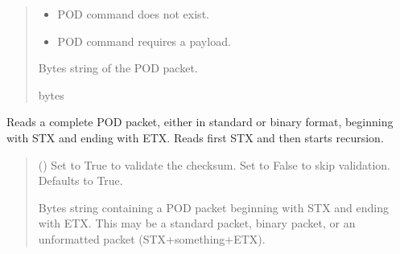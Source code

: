 \documentclass[letterpaper,10pt,english]{sphinxmanual}
\begin{document}
\begin{fulllineitems}
\begin{fulllineitems}
\begin{quote}
\begin{description}
\begin{itemize}
\end{itemize}

\begin{itemize}
\item {} 
\sphinxAtStartPar
{} \textendash{} POD command does not exist.

\item {} 
\sphinxAtStartPar
{} \textendash{} POD command requires a payload.

\end{itemize}

\sphinxAtStartPar
Bytes string of the POD packet.

\sphinxAtStartPar
bytes

\end{description}\end{quote}

\end{fulllineitems}


\begin{fulllineitems}
\label{\detokenize{BasicPodProtocol:BasicPodProtocol.POD_Basics.ReadPODpacket}}
\pysigstartsignatures
{}
\pysigstopsignatures
\sphinxAtStartPar
Reads a complete POD packet, either in standard or binary format, beginning with STX and         ending with ETX. Reads first STX and then starts recursion.
\begin{quote}\begin{description}
\sphinxAtStartPar
{} (\sphinxstyleliteralemphasis{\sphinxupquote{, }}) \textendash{} Set to True to validate the checksum. Set to False to                 skip validation. Defaults to True.

\sphinxAtStartPar
Bytes string containing a POD packet beginning with STX and ending with ETX. This                 may be a standard packet, binary packet, or an unformatted packet (STX+something+ETX).


\end{description}
\end{quote}
\end{fulllineitems}
\end{fulllineitems}
\end{document}
